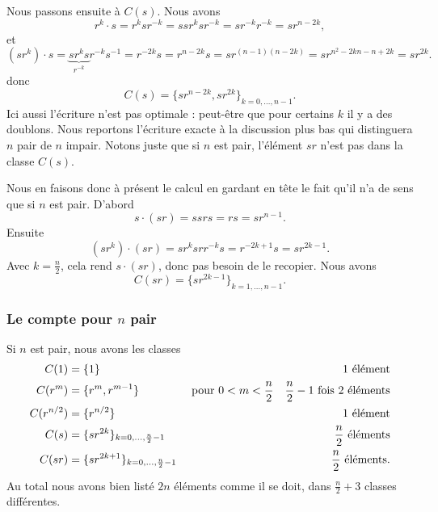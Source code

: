 Nous passons ensuite à \( C(s)\). Nous avons
\begin{equation}
    r^k\cdot s=r^ksr^{-k}=ssr^ksr^{-k}=sr^{-k}r^{-k}=sr^{n-2k},
\end{equation}
et
\begin{equation}
    (sr^k)\cdot s=\underbrace{sr^ks}_{r^{-k}}r^{-k}s^{-1}=r^{-2k}s=r^{n-2k}s=sr^{(n-1)(n-2k)}=sr^{n^2-2kn-n+2k}=sr^{2k}.
\end{equation}
donc
\begin{equation}
    C(s)=\{ sr^{n-2k},sr^{2k} \}_{k=0,\ldots, n-1}.
\end{equation}
Ici aussi l'écriture n'est pas optimale : peut-être que pour certains \( k\) il y a des doublons. Nous reportons l'écriture exacte à la discussion plus bas qui distinguera \( n\) pair de \( n\) impair. Notons juste que si \( n\) est pair, l'élément \( sr\) n'est pas dans la classe \( C(s)\).

Nous en faisons donc à présent le calcul en gardant en tête le fait qu'il n'a de sens que si \( n\) est pair. D'abord
\begin{equation}
    s\cdot (sr)=ssrs=rs=sr^{n-1}.
\end{equation}
Ensuite
\begin{equation}
    (sr^k)\cdot (sr)=sr^ksrr^{-k}s=r^{-2k+1}s=sr^{2k-1}.
\end{equation}
Avec \( k=\frac{ n }{2}\), cela rend \( s\cdot (sr)\), donc pas besoin de le recopier. Nous avons
\begin{equation}
    C(sr)=\{ sr^{2k-1} \}_{k=1,\ldots, n-1}.
\end{equation}

\subsubsection{Le compte pour $ n$ pair}
\label{SubsubsecROVmHuM}

Si \( n\) est pair, nous avons les classes
\begin{subequations}
    \begin{align}
        C(1)&=\{ 1 \}       &&&\text{\( 1\) élément}\\
        C(r^m)&=\{ r^m,r^{m-1} \}&\text{ pour }&0<m<\frac{ n }{2}   &\text{\( \frac{ n }{2}-1\) fois \( 2\) éléments}\\
        C(r^{n/2})&=\{ r^{n/2} \}   &&& \text{\( 1\) élément}\\ 
        C(s)&=\{ sr^{2k} \}_{k=0,\ldots, \frac{ n }{2}-1} &&& \text{\( \frac{ n }{2}\) éléments}\\
        C(sr)&=\{ sr^{2k+1} \}_{k=0,\ldots, \frac{ n }{2}-1} &&& \text{\( \frac{ n }{2}\) éléments}.
    \end{align}
\end{subequations}
Au total nous avons bien listé \( 2n\) éléments comme il se doit, dans \(  \frac{ n }{2}+3\) classes différentes.

